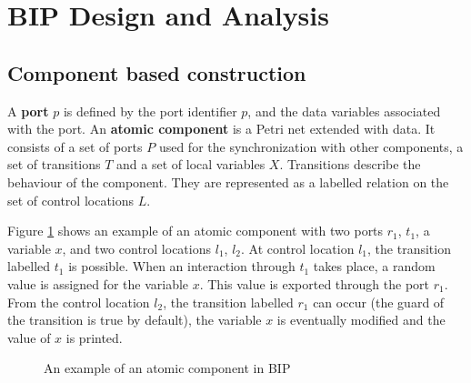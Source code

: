 \section{BIP Design and Analysis}

\subsection{Component based construction}
A \textbf{port} $p$ is defined by the port identifier $p$, and the data variables associated with the port. \newline 
An \textbf{atomic component} is a Petri net extended with data. It consists of a set of ports $P$ used for the synchronization with other components, a set of transitions $T$ and a set of local variables $X$. Transitions describe the behaviour of the component. They are represented as a labelled relation on the set of control locations $L$.

Figure \ref{atom} shows an example of an atomic component with two ports $r_1$, $t_1$, a variable $x$, and two control locations $l_1$, $l_2$. At control location $l_1$, the transition labelled $t_1$ is possible. When an interaction through $t_1$ takes place, a random value is assigned for the variable $x$. This value is exported through the port $r_1$. From the control location $l_2$, the transition labelled $r_1$ can occur (the guard of the transition is true by default), the variable $x$ is eventually modified and the value of $x$ is printed.
\begin{figure}[htbp]
  \begin{center}
        
 \end{center}
  \caption{An example of an atomic component in BIP} \label{atom}
\end{figure}


